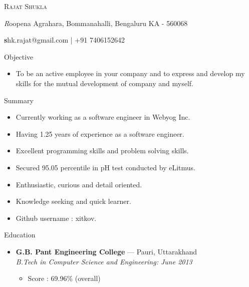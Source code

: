\documentclass[11pt,oneside]{article}
\makeatletter
\newcommand{\name}{Rajat Shukla}
\newcommand{\addr}{Roopena Agrahara, Bommanahalli, Bengaluru KA - 560068}
\newcommand{\contact}{shk.rajat@gmail.com | +91 7406152642}
\newcommand{\bigname}[1]{
  \begin{center}\fontfamily{phv}\selectfont\Huge\scshape#1\end{center}
}
\newcommand{\bignamenew}[1]{
  \begin{center}\selectfont\Huge\scshape#1\end{center}
}
\newcommand{\addrinfo}[1]{
  \begin{center}\selectfont\small\textit#1\end{center}
}
\newcommand{\contactinfo}[1]{
  \begin{center}\selectfont\small\textbf#1\end{center}
}
\newcommand{\resdescpara}[1]{
  \vspace{-5pt}
\item
  #1
}
\newenvironment{ressection}[1]{
  \vspace{4pt}
	     {\fontfamily{phv}\selectfont\Large#1}
	     \begin{itemize}
	       \vspace{3pt}
}{
	     \end{itemize}
}
\newcommand{\resitem}[1]{
  \vspace{-4pt}
\item \begin{flushleft} #1 \end{flushleft}
}
\newcommand{\ressubitem}[1]{
  \vspace{-1pt}
\item \begin{flushleft} #1 \end{flushleft}
}
\newcommand{\resbigitem}[3]{
  \vspace{-5pt}
\item
  \textbf{#1} --- #2 \\
  \textit{#3}
}
\newenvironment{ressubsec}[3]{
  \resbigitem{#1}{#2}{#3}
  \vspace{-2pt}
  \begin{itemize}
}{
  \end{itemize}
}
\makeatother
\begin{document}


\bigname{\name}

\vspace{2 pt}
\addrinfo{\addr}

\contactinfo{\contact}
\vspace{8 pt}

\begin{ressection}{Objective}
  \resdescpara{To be an active employee in your company and to express and develop my skills for the mutual development of company and myself.}
\end{ressection}

\begin{ressection}{Summary}
  \resitem{Currently working as a software engineer in Webyog Inc.}
  \resitem{Having 1.25 years of experience as a software engineer.}
  \resitem{Excellent programming skills and problem solving skills.}
  \resitem{Secured 95.05 percentile in pH test conducted by eLitmus.}
  \resitem{Enthusiastic, curious and detail oriented.}
  \resitem{Knowledge seeking and quick learner.}  
  \resitem{Github username : xitkov.}
\end{ressection}


\begin{ressection}{Education}
  \begin{ressubsec}{G.B. Pant Engineering College}{Pauri, Uttarakhand}{B.Tech in Computer Science and Engineering: June 2013}
	\ressubitem{Score : 69.96\% (overall)}
  \end{ressubsec}
\end{ressection}
\end{document}
